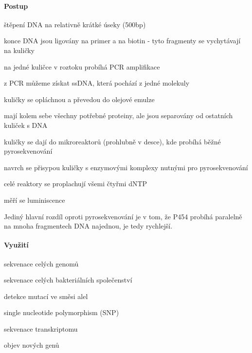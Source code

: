 \documentclass[DIV=8]{scrreprt}
\begin{document}
\paragraph{Postup}
\begin{myEnumerate}[nosep]
    \item štěpení DNA na relativně krátké úseky (500bp)
    \item konce DNA jsou ligovány na primer a na biotin - tyto fragmenty se vychytávají na kuličky
    \item na jedné kuličce v roztoku probíhá PCR amplifikace
\begin{myItemize}[nosep]
    \item z PCR můžeme získat ssDNA, která pochází z jedné molekuly
\end{myItemize}

    \item kuličky se opláchnou a převedou do olejové emulze
\begin{myItemize}[nosep]
    \item mají kolem sebe všechny potřebné proteiny, ale jsou separovány od ostatních kuliček s DNA
\end{myItemize}

    \item kuličky se dají do mikroreaktorů (prohlubně v desce), kde probíhá běžné pyrosekvenování
\begin{myItemize}[nosep]
    \item navrch se přisypou kuličky s enzymovými komplexy nutnými pro pyrosekvenování
    \item celé reaktory se proplachují všemi čtyřmi dNTP
    \item měří se luminiscence
\end{myItemize}

\end{myEnumerate}



Jediný hlavní rozdíl oproti pyrosekvenování je v tom, že P454 probíhá paralelně na mnoha fragmentech DNA najednou, je tedy rychlejší.

\paragraph{Využití}
\begin{myItemize}[nosep]
    \item sekvenace celých genomů
    \item sekvenace celých bakteriálních společenství
    \item detekce mutací ve směsi alel
    \item single nucleotide polymorphism (SNP)
    \item sekvenace transkriptomu
    \item objev nových genů
\end{myItemize}
\end{document}
